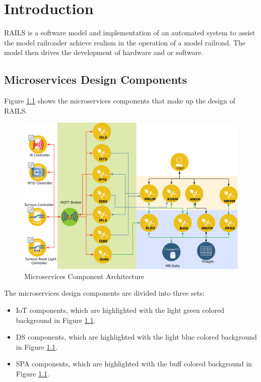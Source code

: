 \chapter{Introduction}
\ac{RAILS} is a software model and implementation of an automated system to assist the model railroader achieve realism in the operation of a model railroad. The model then drives the development of hardware and or software.
\section{Microservices Design Components}
Figure \ref{fig:microarchitecture} shows the microservices components that make up the design of \ac{RAILS}.

\begin{figure}[H]
	\centering
		\includegraphics[scale=0.7]{../System/design.eps}
	\caption{Microservices Component Architecture}
	\label{fig:microarchitecture}
\end{figure}

The microservices design components are divided into three sets:
\begin{itemize}
  \item \ac{IoT} components, which are highlighted with the light green colored background in Figure \ref{fig:microarchitecture}.
  \item \ac{DS} components, which are highlighted with the light blue colored background in Figure \ref{fig:microarchitecture}.
  \item \ac{SPA} components, which are highlighted with the buff colored background in Figure \ref{fig:microarchitecture}.
\end{itemize}

